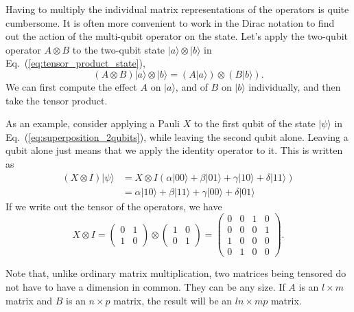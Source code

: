 Having to multiply the individual matrix representations of the operators is quite cumbersome.
It is often more convenient to work in the Dirac notation to find out the action of the multi-qubit operator on the state.
Let's apply the two-qubit operator $A\otimes B$ to the two-qubit state $|a\rangle\otimes|b\rangle$ in Eq.~(\ref{eq:tensor_product_state}),
\begin{equation}
    (A\otimes B) |a\rangle\otimes|b\rangle = (A|a\rangle) \otimes (B|b\rangle).
\end{equation}
We can first compute the effect $A$ on $|a\rangle$, and of $B$ on $|b\rangle$ individually, and then take the tensor product.

As an example, consider applying a Pauli $X$ to the first qubit of the state $|\psi\rangle$ in Eq.~(\ref{eq:superposition_2qubits}), while leaving the second qubit alone. Leaving a qubit alone just means that we apply the identity operator to it. This is written as
\begin{equation}
\begin{aligned}
    (X \otimes I)|\psi\rangle &=X \otimes I(\alpha|00\rangle+\beta|01\rangle+\gamma|10\rangle+\delta|11\rangle) \\
    &=\alpha|10\rangle+\beta|11\rangle+\gamma|00\rangle+\delta|01\rangle
\end{aligned}
\end{equation}
If we write out the tensor of the operators, we have
\begin{equation}
X \otimes I=\left(\begin{array}{ll}
0 & 1 \\
1 & 0
\end{array}\right) \otimes\left(\begin{array}{ll}
1 & 0 \\
0 & 1
\end{array}\right)=\left(\begin{array}{llll}
0 & 0 & 1 & 0 \\
0 & 0 & 0 & 1 \\
1 & 0 & 0 & 0 \\
0 & 1 & 0 & 0
\end{array}\right).
\end{equation}

Note that, unlike ordinary matrix multiplication, two matrices being tensored do not have to have a dimension in common. They can be any size. If $A$ is an $l\times m$ matrix and $B$ is an $n \times p$ matrix, the result will be an $ln \times mp$ matrix.

